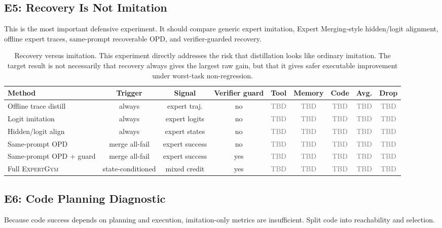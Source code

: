 \documentclass[11pt]{article}
\newcommand{\method}{\textsc{ExpertGym}\xspace}
\newcommand{\TODO}{\textcolor{gray}{TBD}}
\begin{document}
\subsection{E5: Recovery Is Not Imitation}

This is the most important defensive experiment.  It should compare generic expert imitation, Expert Merging-style hidden/logit alignment, offline expert traces, same-prompt recoverable OPD, and verifier-guarded recovery.

\begin{table}[t]
\centering
\small
\setlength{\tabcolsep}{3.2pt}
\begin{tabular}{lcccccccc}
\toprule
Method & Trigger & Signal & Verifier guard & Tool & Memory & Code & Avg. & Drop \\
\midrule
Offline trace distill & always & expert traj. & no & \TODO & \TODO & \TODO & \TODO & \TODO \\
Logit imitation & always & expert logits & no & \TODO & \TODO & \TODO & \TODO & \TODO \\
Hidden/logit align & always & expert states & no & \TODO & \TODO & \TODO & \TODO & \TODO \\
Same-prompt OPD & merge all-fail & expert success & no & \TODO & \TODO & \TODO & \TODO & \TODO \\
Same-prompt OPD + guard & merge all-fail & expert success & yes & \TODO & \TODO & \TODO & \TODO & \TODO \\
Full \method & state-conditioned & mixed credit & yes & \TODO & \TODO & \TODO & \TODO & \TODO \\
\bottomrule
\end{tabular}
\caption{Recovery versus imitation.  This experiment directly addresses the risk that distillation looks like ordinary imitation.  The target result is not necessarily that recovery always gives the largest raw gain, but that it gives safer executable improvement under worst-task non-regression.}
\label{tab:imitation}
\end{table}

\subsection{E6: Code Planning Diagnostic}

Because code success depends on planning and execution, imitation-only metrics are insufficient.  Split code into reachability and selection.
\end{document}
